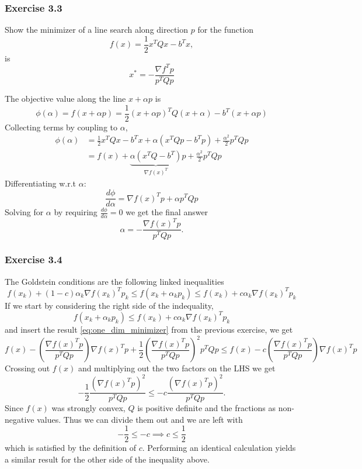 \subsubsection{Exercise 3.3}

Show the minimizer of a line search along direction $p$ for the function
\[
    f(x) = \frac{1}{2}x^T Q x - b^Tx,
\]
is
\[
    x^* = -\frac{\nabla f^T p}{p^T Q p}
\]

The objective value along the line $x + \alpha p$ is
\[
    \phi(\alpha) = f(x + \alpha p) = \frac{1}{2}(x + \alpha p)^T Q (x + \alpha) - b^T(x + \alpha p)
\]
Collecting terms by coupling to $\alpha$,
\begin{align*}
    \phi(\alpha) & = \frac{1}{2}x^T Q x - b^T x + \alpha(x^T Q p  - b^T p) + \frac{\alpha^2}{2} p^T Q p \\
                 & = f(x) + \underbrace{\alpha(x^T Q  - b^T)}_{\nabla f(x)^T}p + \frac{\alpha^2}{2} p^T Q p
\end{align*}
Differentiating w.r.t $\alpha$:
\[
    \frac{d\phi}{d\alpha} = \nabla f(x)^T p + \alpha p^T Q p
\]
Solving for $\alpha$ by requiring $\frac{d\phi}{d\alpha} = 0$ we get the final answer
\begin{equation}
    \alpha = -\frac{\nabla f(x)^T p}{p^T Q p}.
    \label{eq:one_dim_minimizer}
\end{equation}
\subsubsection{Exercise 3.4}
The Goldstein conditions are the following linked inequalities
\[
  f(x_k) + (1 - c)\alpha_k\nabla f(x_k)^T p_k \leq f(x_k + \alpha_k p_k) \leq f(x_k) + c \alpha_k \nabla f(x_k)^T p_k
\]
If we start by considering the right side of the indequality,
\[
    f(x_k + \alpha_k p_k) \leq f(x_k) + c \alpha_k \nabla f(x_k)^T p_k
\]
and insert the result \eqref{eq:one_dim_minimizer} from the previous exercise, we get
\[
    f(x) - \left(\frac{\nabla f(x)^T p}{p^T Q p}\right)\nabla f(x)^T p + \frac{1}{2}\left(\frac{\nabla f(x)^T p}{p^T Q p}\right)^2 p^T Q p \leq  f(x) - c \left(\frac{\nabla f(x)^T p}{p^T Q p}\right) \nabla f(x)^T p
\]
Crossing out $f(x)$ and multiplying out the two factors on the LHS we get
\[
    -\frac{1}{2}\frac{(\nabla f(x)^T p)^2}{p^T Q p} \leq -c \frac{(\nabla f(x)^T p)^2}{p^T Q p}.
\]
Since $f(x)$ was strongly convex, $Q$ is positive definite and the fractions as non-negative values. 
Thus we can divide them out and we are left with 
\[
    -\frac{1}{2} \leq -c \implies c \leq \frac{1}{2}
\]
which is satisfied by the definition of $c$.
Performing an identical calculation yields a similar result for the other side of the inequality above.